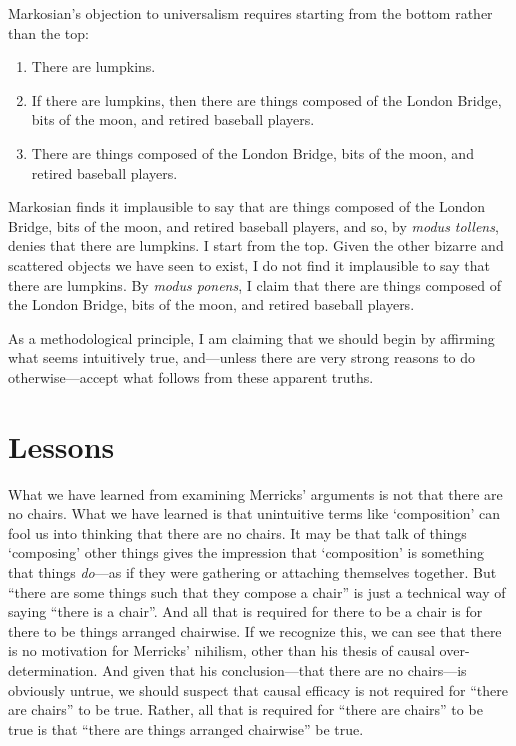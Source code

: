 \documentclass[11pt]{article}
\begin{document}
\begin{spacing}{1.25}
Markosian's objection to universalism requires starting from the
bottom rather than the top:

\begin{enumerate}
  \item There are lumpkins.
  \item If there are lumpkins, then there are things composed of the
    London Bridge, bits of the moon, and retired baseball players.
  \item There are things composed of the London Bridge, bits of the
    moon, and retired baseball players.
\end{enumerate}

Markosian finds it implausible to say that are things composed of the
London Bridge, bits of the moon, and retired baseball players, and so,
by {\em modus tollens}, denies that there are lumpkins.  I start from
the top.  Given the other bizarre and scattered objects we have seen
to exist, I do not find it implausible to say that there are lumpkins.
By {\em modus ponens}, I claim that there are things composed of the
London Bridge, bits of the moon, and retired baseball players.

As a methodological principle, I am claiming that we should begin by
affirming what seems intuitively true, and---unless there are very
strong reasons to do otherwise---accept what follows from these
apparent truths.

\section{Lessons}
\label{lessons-m}
What we have learned from examining Merricks' arguments is not that
there are no chairs.  What we have learned is that unintuitive terms
like `composition' can fool us into thinking that there are no chairs.
It may be that talk of things `composing' other things gives the
impression that `composition' is something that things {\em do}---as
if they were gathering or attaching themselves together.  But ``there
are some things such that they compose a chair'' is just a technical
way of saying ``there is a chair''.  And all that is required for
there to be a chair is for there to be things arranged chairwise.  If
we recognize this, we can see that there is no motivation for
Merricks' nihilism, other than his thesis of causal
over-determination.  And given that his conclusion---that there are no
chairs---is obviously untrue, we should suspect that causal efficacy
is not required for ``there are chairs'' to be true.  Rather, all that
is required for ``there are chairs'' to be true is that ``there are
things arranged chairwise'' be true.


\end{spacing}
\end{document}
